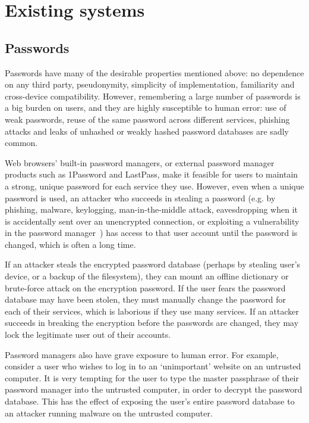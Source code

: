 \section{Existing systems}
\subsection{Passwords}

Passwords have many of the desirable properties mentioned above: no dependence on any third party,
pseudonymity, simplicity of implementation, familiarity and cross-device compatibility. However,
remembering a large number of passwords is a big burden on users, and they are highly susceptible to
human error: use of weak passwords, reuse of the same password across different services, phishing
attacks and leaks of unhashed or weakly hashed password databases are sadly common.

Web browsers' built-in password managers, or external password manager products such as 1Password
and LastPass, make it feasible for users to maintain a strong, unique password for each service they
use. However, even when a unique password is used, an attacker who succeeds in stealing a password
(e.g. by phishing, malware, keylogging, man-in-the-middle attack, eavesdropping when it is
accidentally sent over an unencrypted connection, or exploiting a vulnerability in the password
manager~\cite{Li14, Silver14}) has access to that user account until the password is changed, which
is often a long time.

If an attacker steals the encrypted password database (perhaps by stealing user's device, or a
backup of the filesystem), they can mount an offline dictionary or brute-force attack on the
encryption password. If the user fears the password database may have been stolen, they must
manually change the password for each of their services, which is laborious if they use many
services. If an attacker succeeds in breaking the encryption before the passwords are changed, they
may lock the legitimate user out of their accounts.

Password managers also have grave exposure to human error. For example, consider a user who wishes
to log in to an `unimportant' website on an untrusted computer. It is very tempting for the user to
type the master passphrase of their password manager into the untrusted computer, in order to
decrypt the password database. This has the effect of exposing the user's entire password database
to an attacker running malware on the untrusted computer.

